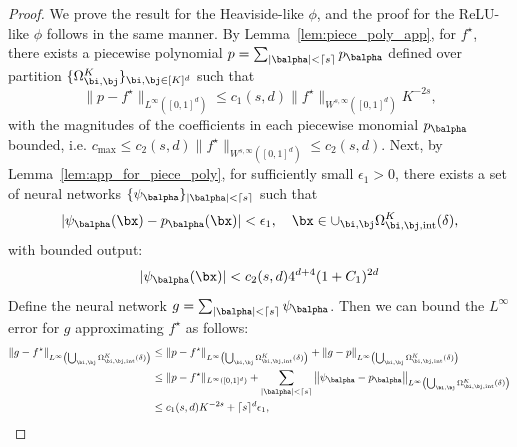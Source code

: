 \documentclass[11pt]{article}
\begin{document}
\begin{proof}
    We prove the result for the Heaviside-like $\phi$, and the proof for the ReLU-like $\phi$ follows in the same manner.
    By Lemma~\ref{lem:piece_poly_app}, for $f^{\star}$, there exists a piecewise polynomial $p = \sum_{|\balpha| < \lceil s\rceil} p_{\balpha}$ defined over partition $\{\Omega_{\bi,\bj}^K\}_{\bi, \bj \in [K]^d}$ such that 
     \begin{equation*}
         \| p -f^{\star}\|_{L^{\infty}([0,1]^d)} \leq c_1(s,d) \|f^{\star}\|_{W^{s,\infty}([0,1]^d)} K^{-2s},
     \end{equation*}
     with the magnitudes of the coefficients in each piecewise monomial $p_{{\balpha}}$ bounded, i.e. $c_{\max} \leq c_2(s,d) \|f^{\star}\|_{W^{s,\infty}([0,1]^d)} \leq c_2(s,d)$. Next, by Lemma~\ref{lem:app_for_piece_poly}, for sufficiently small $\epsilon_1 > 0 $,
     there exists a set of neural networks $\{ \psi_{\balpha}\}_{|\balpha |< \lceil s\rceil}$ such that 
     \begin{equation*}
         |\psi_{\balpha}(\bx) - p_{\balpha}(\bx)| < \epsilon_1, \quad \bx \in \cup_{\bi, \bj} \Omega_{\bi, \bj, \mathrm{int}}^K(\delta),
     \end{equation*}
     with bounded output:
     \begin{equation*}
        |\psi_{\balpha}(\bx)| < c_2(s, d) 4^{d+4}(1+C_1)^{2d}
     \end{equation*}
     Define the neural network $g = \sum_{|\balpha|< \lceil s \rceil} \psi_{\balpha}$. Then we can bound the $L^\infty$ error for $g$ approximating $f^{\star}$ as follows:
     \begin{equation*}
         \begin{aligned}
             \left\| g - f^{\star} \right\|_{L^\infty\left(\bigcup_{\bi,\bj} \Omega^K_{\bi, \bj, \mathrm{int}}(\delta)\right)} & \leq \left\| p - f^{\star} \right\|_{L^\infty\left(\bigcup_{\bi,\bj} \Omega^K_{\bi, \bj, \mathrm{int}}(\delta)\right)} + \left\| g - p \right\|_{L^\infty\left(\bigcup_{\bi,\bj} \Omega^K_{\bi, \bj, \mathrm{int}}(\delta)\right)} \\
             & \leq \|p - f^{\star}\|_{L^{\infty}([0,1]^d)} + \sum_{|\balpha|< \lceil s\rceil} \left\| \psi_{\balpha} - p_{\balpha}\right\|_{L^\infty\left(\bigcup_{\bi,\bj} \Omega^K_{\bi, \bj, \mathrm{int}}(\delta)\right)}\\
             & \leq c_1(s,d) K^{-2s} + \lceil s \rceil^d \epsilon_1,
         \end{aligned}
     \end{equation*}

\end{proof}
\end{document}
